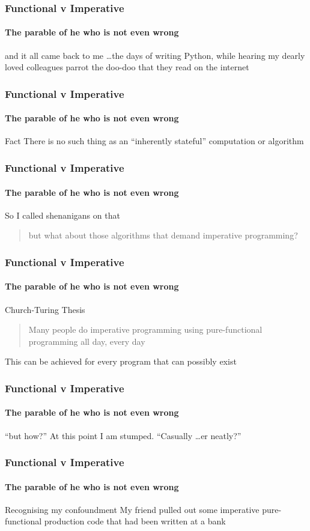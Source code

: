 {\begin{frame}
\frametitle{Functional v Imperative}
\framesubtitle{The parable of he who is not even wrong}
\begin{block}{and it all came back to me}
\ldots the days of writing Python, while hearing my dearly loved colleagues parrot the doo-doo that they read on the internet
\end{block}
\end{frame}


\begin{frame}
\frametitle{Functional v Imperative}
\framesubtitle{The parable of he who is not even wrong}
\begin{block}{Fact}
There is no such thing as an ``inherently stateful'' computation or algorithm
\end{block}
\end{frame}


\begin{frame}
\frametitle{Functional v Imperative}
\framesubtitle{The parable of he who is not even wrong}
\begin{block}{So I called shenanigans on that}
\begin{quote}
but what about those algorithms that demand imperative programming?
\end{quote}
\end{block}
\end{frame}


\begin{frame}
\frametitle{Functional v Imperative}
\framesubtitle{The parable of he who is not even wrong}
\begin{block}{Church-Turing Thesis}
\begin{quote}
Many people do imperative programming using pure-functional programming all day, every day
\end{quote}
This can be achieved for every program that can possibly exist
\end{block}
\end{frame}


\begin{frame}
\frametitle{Functional v Imperative}
\framesubtitle{The parable of he who is not even wrong}
\begin{block}{``but how?''}
At this point I am stumped. ``Casually \ldots er neatly?''
\end{block}
\end{frame}


\begin{frame}
\frametitle{Functional v Imperative}
\framesubtitle{The parable of he who is not even wrong}
\begin{block}{Recognising my confoundment}
My friend pulled out some imperative pure-functional production code that had been written at a bank
\end{block}
\end{frame}


}
